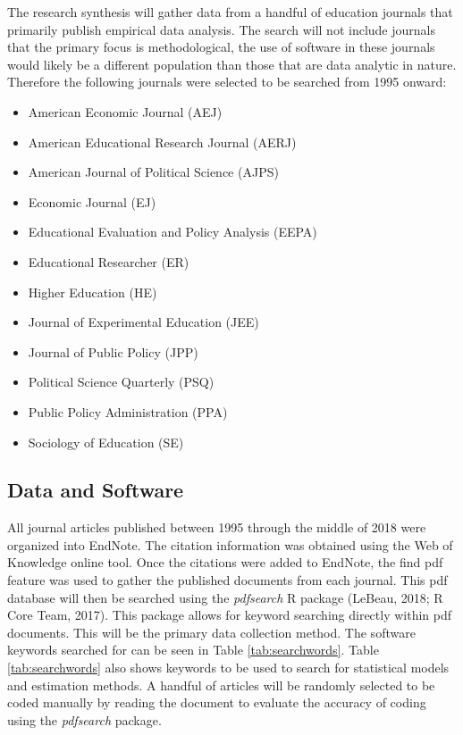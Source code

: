 \documentclass[english,,man]{apa6}
\providecommand{\tightlist}{%
  \setlength{\itemsep}{0pt}\setlength{\parskip}{0pt}}
\theoremstyle{definition}
\theoremstyle{definition}
\theoremstyle{definition}
\theoremstyle{remark}
\begin{document}
The research synthesis will gather data from a handful of education
journals that primarily publish empirical data analysis. The search will
not include journals that the primary focus is methodological, the use
of software in these journals would likely be a different population
than those that are data analytic in nature. Therefore the following
journals were selected to be searched from 1995 onward:

\begin{itemize}
\tightlist
\item
  American Economic Journal (AEJ)
\item
  American Educational Research Journal (AERJ)
\item
  American Journal of Political Science (AJPS)
\item
  Economic Journal (EJ)
\item
  Educational Evaluation and Policy Analysis (EEPA)
\item
  Educational Researcher (ER)
\item
  Higher Education (HE)
\item
  Journal of Experimental Education (JEE)
\item
  Journal of Public Policy (JPP)
\item
  Political Science Quarterly (PSQ)
\item
  Public Policy Administration (PPA)
\item
  Sociology of Education (SE)
\end{itemize}

\hypertarget{data-and-software}{%
\subsection{Data and Software}\label{data-and-software}}

All journal articles published between 1995 through the middle of 2018
were organized into EndNote. The citation information was obtained using
the Web of Knowledge online tool. Once the citations were added to
EndNote, the find pdf feature was used to gather the published documents
from each journal. This pdf database will then be searched using the
\emph{pdfsearch} R package (LeBeau, 2018; R Core Team, 2017). This
package allows for keyword searching directly within pdf documents. This
will be the primary data collection method. The software keywords
searched for can be seen in Table \ref{tab:searchwords}. Table
\ref{tab:searchwords} also shows keywords to be used to search for
statistical models and estimation methods. A handful of articles will be
randomly selected to be coded manually by reading the document to
evaluate the accuracy of coding using the \emph{pdfsearch} package.
\end{document}
